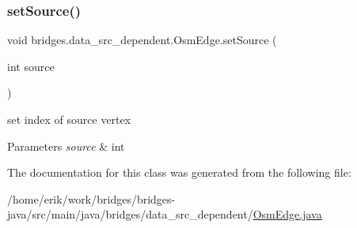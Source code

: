 \subsubsection{\texorpdfstring{set\+Source()}{setSource()}}
{\footnotesize\ttfamily void bridges.\+data\+\_\+src\+\_\+dependent.\+Osm\+Edge.\+set\+Source (\begin{DoxyParamCaption}\item[{int}]{source }\end{DoxyParamCaption})}

set index of source vertex 
\begin{DoxyParams}{Parameters}
{\em source} & int \\
\hline
\end{DoxyParams}


The documentation for this class was generated from the following file\+:\begin{DoxyCompactItemize}
\item 
/home/erik/work/bridges/bridges-\/java/src/main/java/bridges/data\+\_\+src\+\_\+dependent/\hyperlink{_osm_edge_8java}{Osm\+Edge.\+java}\end{DoxyCompactItemize}
